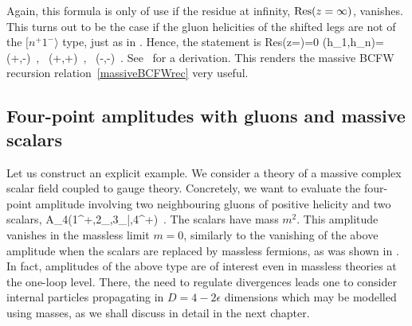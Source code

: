 Again, this formula is only of use if 
the residue at infinity, ${\rm Res}(z=\infty)$, vanishes. This turns out to be the case if the
gluon helicities of the shifted legs are not of the $[n^{+}1^{-}\rangle$ type, just as in 
. Hence, the
statement is
%
\be
{\rm Res}(z=\infty)=0 \quad {}\quad 
(h_{1},h_{n})= (+,-)\, , \, (+,+)\, , \, (-,-)\, .
\ee
%
See~\cite{ch2_Badger:2005zh} for a derivation. This renders the massive BCFW
recursion relation~\eqref{massiveBCFWrec} very useful.



\subsection{Four-point amplitudes with gluons and massive scalars}

Let us construct an explicit example. We consider a theory of a massive complex 
scalar field coupled to gauge theory.
Concretely, we want to evaluate the four-point amplitude involving two neighbouring
gluons of positive helicity and two scalars, 
%
\be
\label{ggpp}
A_{4}(1^{+},2_{\phi},3_{\bar\phi},4^{+})\, .
\ee
%
The scalars have mass $m^{2}$. This amplitude vanishes
in the massless limit $m=0$, similarly to the vanishing of
the above amplitude when the scalars are replaced by massless fermions, as was
shown in .  In fact, amplitudes of the above type are of interest even
in massless theories at the one-loop level. There, the need to 
regulate divergences leads one to consider internal particles propagating
in $D=4-2\epsilon$ dimensions which may be modelled using masses, as we shall discuss in detail in the next chapter.

